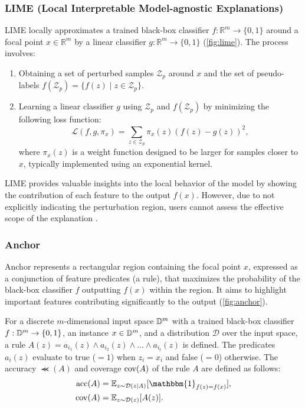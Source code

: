 \documentclass[11pt]{article}
\begin{document}
\subsubsection[LIME]{%
	LIME (Local Interpretable Model-agnostic Explanations)
	\cite{ribeiro2016why}
}
LIME locally
approximates a trained black-box classifier $f: \mathbb{R}^m \to \{0,1\}$
around a focal point $x \in \mathbb{R}^m$
by a linear classifier $g: \mathbb{R}^m \to \{0,1\}$
(\cref{fig:lime}).
The process involves:
\begin{enumerate}
	\item Obtaining a set of perturbed samples $\mathcal{Z}_p$ around $x$
	      and the set of pseudo-labels $f(\mathcal{Z}_p) = \{f(z) \mid z \in \mathcal{Z}_p\}$.
	\item Learning a linear classifier $g$
	      using $\mathcal{Z}_p$ and $f(\mathcal{Z}_p)$
	      by minimizing the following loss function:
	      \begin{equation}
		      \label{eq:lime_loss}
		      \mathcal{L}(f,g,\pi_x)=\sum_{z\in\mathcal{Z}_p}
		      \pi_x(z){\left(f(z)-g(z)\right)}^2,
	      \end{equation}
	      where $\pi_x(z)$ is a weight function designed to be larger for samples
	      closer to $x$, typically implemented using an exponential kernel.
\end{enumerate}

LIME provides valuable insights into the local behavior of the model
by showing the contribution of each feature to the output $f(x)$.
However, due to not explicitly indicating the perturbation region,
users cannot assess the effective scope of the explanation
\cite{ribeiro2018anchors}.

\subsubsection[Anchor]{%
	Anchor~\cite{ribeiro2018anchors}
}\label{sec:anchor}
Anchor represents a rectangular region containing the focal point $x$,
expressed as a conjunction of feature predicates (a rule),
that maximizes the probability of the black-box classifier $f$
outputting $f(x)$ within the region.
It aims to highlight important features
contributing significantly to the output (\cref{fig:anchor}).

For a discrete $m$-dimensional input space $\mathbb{D}^{m}$
with a trained black-box classifier $f: \mathbb{D}^{m} \to \{0,1\}$,
an instance $x \in \mathbb{D}^{m}$,
and a distribution $\mathcal{D}$ over the input space,
a rule $A(z) = a_{i_1}(z) \wedge a_{i_2}(z) \wedge \dots \wedge a_{i_t}(z)$ is defined.
The predicates $a_i(z)$ evaluate to true ($=1$) when $z_i = x_i$ and false ($=0$) otherwise.
The accuracy $\Prec(A)$ and coverage $\operatorname{cov}(A)$ of the rule $A$ are defined as follows:
\begin{align}
	\Prec(A) & =\mathbb{E}_{z\sim\mathcal{D}(z|A)}
	[\mathbbm{1}_{f(z)=f(x)}], \label{eq:anchor_def_prec} \\
	\Cov(A)  & =\mathbb{E}_{z\sim\mathcal{D}(z)}[A(z)].
\end{align}
\end{document}
